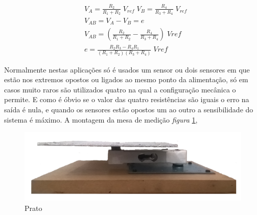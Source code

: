 \begin{minipage}[!b]{.6\linewidth}
	\begin{align}
		\label{eq:wheatstone}
		&V_A =  \frac{R_2}{R_1 + R_2} \; V_{ref} \; V_B=\frac{R_4}{R_3 + R_4} \; V_{ref} \\
		&V_{AB} =  V_A - V_B = e \\
		&V_{AB}= \left(\frac{R_2}{R_1 + R_2} - \frac{R_4}{R_3 + R_4}\right) \; Vref \\
		&e = \frac{R_2 R_3 - R_4 R_1}{(R_1 + R_2)(R_3 + R_4)} \; Vref
	\end{align}
\end{minipage}
Normalmente nestas aplicações só é usados um sensor ou dois sensores em que estão nos extremos opostos  ou ligados ao mesmo ponto da alimentação, só em casos muito raros são utilizados quatro na qual a configuração mecânica o permite. E como é óbvio se o valor das quatro resistências são iguais o erro na saída é nula, e quando os sensores estão opostos um ao outro a sensibilidade do sistema é máximo.
\newpage
A montagem da mesa de medição \textit{figura} \ref{Prato},
\begin{minipage}[!b]{\linewidth}
\begin{figure}[H]
	\centering
	\includegraphics[scale=0.16]{./image/PESTA/material/Prato.jpg}
	\caption{Prato}
	\label{Prato}
\end{figure}
\end{minipage}
\newpage
